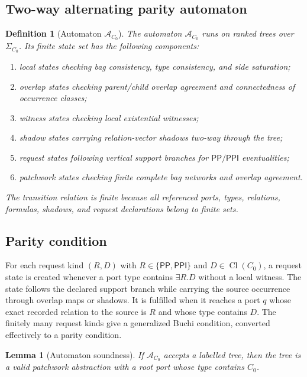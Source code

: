\documentclass[11pt]{article}
\newtheorem{lemma}[theorem]{Lemma}
\newtheorem{definition}[theorem]{Definition}
\newcommand{\PP}{\mathsf{PP}}
\newcommand{\PPI}{\mathsf{PPI}}
\newcommand{\Cl}{\operatorname{Cl}}
\newcommand{\APTA}{\mathcal A}
\begin{document}
\subsection{Two-way alternating parity automaton}

\begin{definition}[Automaton $\APTA_{C_0}$]
The automaton $\APTA_{C_0}$ runs on ranked trees over $\Sigma_{C_0}$.  Its finite state set has the following components:
\begin{enumerate}[label=(Q\arabic*)]
\item local states checking bag consistency, type consistency, and side saturation;
\item overlap states checking parent/child overlap agreement and connectedness of occurrence classes;
\item witness states checking local existential witnesses;
\item shadow states carrying relation-vector shadows two-way through the tree;
\item request states following vertical support branches for $\PP/\PPI$ eventualities;
\item patchwork states checking finite complete bag networks and overlap agreement.
\end{enumerate}
The transition relation is finite because all referenced ports, types, relations, formulas, shadows, and request declarations belong to finite sets.
\end{definition}

\subsection{Parity condition}

For each request kind $(R,D)$ with $R\in\{\PP,\PPI\}$ and $D\in\Cl(C_0)$, a request state is created whenever a port type contains $\exists R.D$ without a local witness.  The state follows the declared support branch while carrying the source occurrence through overlap maps or shadows.  It is fulfilled when it reaches a port $q$ whose exact recorded relation to the source is $R$ and whose type contains $D$.  The finitely many request kinds give a generalized Buchi condition, converted effectively to a parity condition.

\begin{lemma}[Automaton soundness]\label{lem:auto-sound}
If $\APTA_{C_0}$ accepts a labelled tree, then the tree is a valid patchwork abstraction with a root port whose type contains $C_0$.
\end{lemma}
\end{document}
